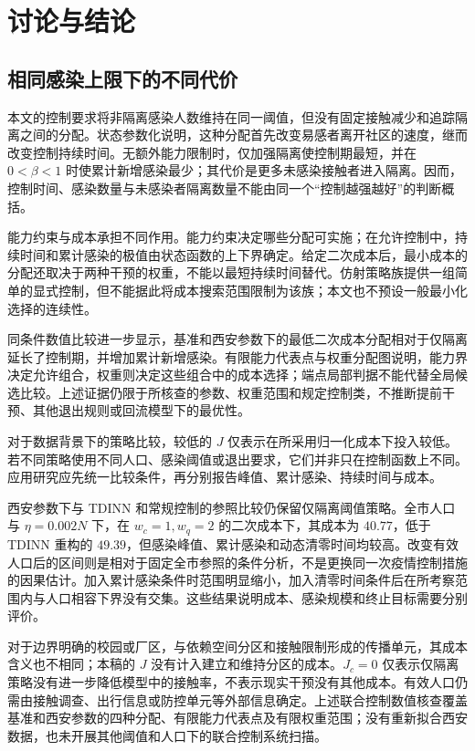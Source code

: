 \section{讨论与结论}
\label{sec:discussion}
\subsection{相同感染上限下的不同代价}
本文的控制要求将非隔离感染人数维持在同一阈值，但没有固定接触减少和追踪隔离之间的分配。状态参数化说明，这种分配首先改变易感者离开社区的速度，继而改变控制持续时间。无额外能力限制时，仅加强隔离使控制期最短，并在 $0<\beta<1$ 时使累计新增感染最少；其代价是更多未感染接触者进入隔离。因而，控制时间、感染数量与未感染者隔离数量不能由同一个“控制越强越好”的判断概括。

能力约束与成本承担不同作用。能力约束决定哪些分配可实施；在允许控制中，持续时间和累计感染的极值由状态函数的上下界确定。给定二次成本后，最小成本的分配还取决于两种干预的权重，不能以最短持续时间替代。仿射策略族提供一组简单的显式控制，但不能据此将成本搜索范围限制为该族；本文也不预设一般最小化选择的连续性。

同条件数值比较进一步显示，基准和西安参数下的最低二次成本分配相对于仅隔离延长了控制期，并增加累计新增感染。有限能力代表点与权重分配图说明，能力界决定允许组合，权重则决定这些组合中的成本选择；端点局部判据不能代替全局候选比较。上述证据仍限于所核查的参数、权重范围和规定控制类，不推断提前干预、其他退出规则或回流模型下的最优性。

对于数据背景下的策略比较，较低的 $J$ 仅表示在所采用归一化成本下投入较低。若不同策略使用不同人口、感染阈值或退出要求，它们并非只在控制函数上不同。应用研究应先统一比较条件，再分别报告峰值、累计感染、持续时间与成本。

西安参数下与 TDINN 和常规控制的参照比较仍保留仅隔离阈值策略。全市人口与 $\eta=0.002N$ 下，在 $w_c=1,w_q=2$ 的二次成本下，其成本为 $40.77$，低于 TDINN 重构的 $49.39$，但感染峰值、累计感染和动态清零时间均较高。改变有效人口后的区间则是相对于固定全市参照的条件分析，不是更换同一次疫情控制措施的因果估计。加入累计感染条件时范围明显缩小，加入清零时间条件后在所考察范围内与人口相容下界没有交集。这些结果说明成本、感染规模和终止目标需要分别评价。

对于边界明确的校园或厂区，与依赖空间分区和接触限制形成的传播单元，其成本含义也不相同；本稿的 $J$ 没有计入建立和维持分区的成本。$J_c=0$ 仅表示仅隔离策略没有进一步降低模型中的接触率，不表示现实干预没有其他成本。有效人口仍需由接触调查、出行信息或防控单元等外部信息确定。上述联合控制数值核查覆盖基准和西安参数的四种分配、有限能力代表点及有限权重范围；没有重新拟合西安数据，也未开展其他阈值和人口下的联合控制系统扫描。

